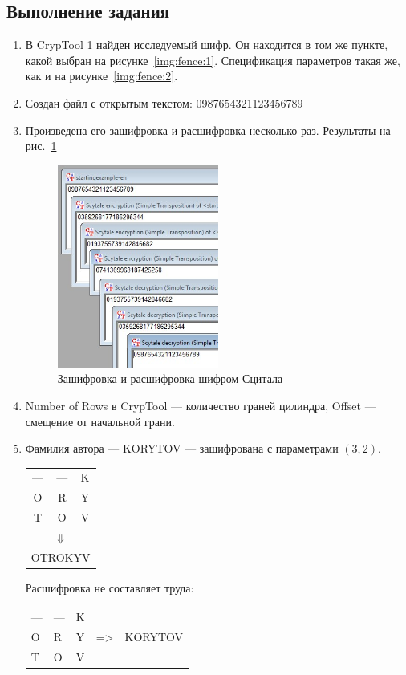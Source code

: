 \documentclass[a4paper, 14pt]{extarticle}
\begin{document}
\subsection{Выполнение задания}
\begin{enumerate}
    \item В CrypTool 1 найден исследуемый шифр. Он находится в том же пункте, какой выбран на рисунке~\ref{img:fence:1}. Спецификация параметров такая же, как и на рисунке~\ref{img:fence:2}.
    \item Создан файл с открытым текстом: 0987654321123456789
    \item Произведена его зашифровка и расшифровка несколько раз. Результаты на рис.~\ref{img:scytale:1}
    \begin{figure}[h]
        \centering
        \includegraphics[width=0.5\textwidth]{img/S007.jpg}
        \caption{Зашифровка и расшифровка шифром Сцитала}%
        \label{img:scytale:1}
    \end{figure}
    \item Number of Rows в CrypTool --- количество граней цилиндра, Offset --- смещение от начальной грани.
    \item Фамилия автора --- KORYTOV --- зашифрована с параметрами $(3, 2)$.\\
    \begin{tabular}{ccc}
    --- & --- & K \\
    O & R & Y \\
    T & O & V \\
    \multicolumn{3}{c}{$\Downarrow$} \\
    \multicolumn{3}{c}{OTROKYV}
    \end{tabular}

    Расшифровка не составляет труда:\\
    \begin{tabularx}{0.8\textwidth}{XXXXX}
    --- & --- & K &  &  \\
    O & R & Y & =\textgreater{} & KORYTOV \\
    T & O & V &  & 
    \end{tabularx}


\end{enumerate}
\end{document}
